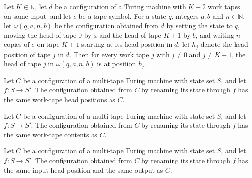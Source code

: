 \begin{lemma}
\label{Turing.cw_cfg_pos}
\leanok
{}
Let $K\in\mathbb{N}$, let $d$ be a configuration of a Turing machine with $K+2$ work tapes on
some input, and let $e$ be a tape symbol. For a state $q$, integers $a,b$ and $n\in\mathbb{N}$,
let $\omega(q,a,n,b)$ be the configuration obtained from $d$ by setting the state to $q$,
moving the head of tape $0$ by $a$ and the head of tape $K+1$ by $b$, and writing $n$ copies of
$e$ on tape $K+1$ starting at its head position in $d$; let $h_j$ denote the head position of
tape $j$ in $d$. Then for every work tape $j$ with $j\ne 0$ and $j\ne K+1$, the head of tape
$j$ in $\omega(q,a,n,b)$ is at position $h_j$.
\end{lemma}

\begin{lemma}
\label{Turing.cw_mapState_pos}
\leanok
{}
Let $C$ be a configuration of a multi-tape Turing machine with state set $S$, and let $f:S\to
S'$. The configuration obtained from $C$ by renaming its state through $f$ has the same
work-tape head positions as $C$.
\end{lemma}

\begin{lemma}
\label{Turing.cw_mapState_tapes}
\leanok
{}
Let $C$ be a configuration of a multi-tape Turing machine with state set $S$, and let $f:S\to
S'$. The configuration obtained from $C$ by renaming its state through $f$ has the same
work-tape contents as $C$.
\end{lemma}

\begin{lemma}
\label{Turing.cw_mapState_io}
\leanok
{}
Let $C$ be a configuration of a multi-tape Turing machine with state set $S$, and let $f:S\to
S'$. The configuration obtained from $C$ by renaming its state through $f$ has the same
input-head position and the same output as $C$.
\end{lemma}

